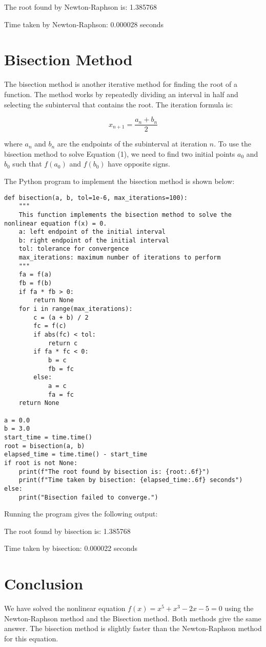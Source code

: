 \documentclass{article}
\begin{document}

The root found by Newton-Raphson is: 1.385768

Time taken by Newton-Raphson: 0.000028 seconds

\section{Bisection Method}

The bisection method is another iterative method for finding the root of a function. The method works by repeatedly dividing an interval in half and selecting the subinterval that contains the root. The iteration formula is:

\begin{equation}
    x_{n+1} = \frac{a_n + b_n}{2}
\end{equation}

where $a_n$ and $b_n$ are the endpoints of the subinterval at iteration $n$. To use the bisection method to solve Equation (1), we need to find two initial points $a_0$ and $b_0$ such that $f(a_0)$ and $f(b_0)$ have opposite signs.


The Python program to implement the bisection method is shown below:

\begin{lstlisting}
def bisection(a, b, tol=1e-6, max_iterations=100):
    """
    This function implements the bisection method to solve the nonlinear equation f(x) = 0.
    a: left endpoint of the initial interval
    b: right endpoint of the initial interval
    tol: tolerance for convergence
    max_iterations: maximum number of iterations to perform
    """
    fa = f(a)
    fb = f(b)
    if fa * fb > 0:
        return None
    for i in range(max_iterations):
        c = (a + b) / 2
        fc = f(c)
        if abs(fc) < tol:
            return c
        if fa * fc < 0:
            b = c
            fb = fc
        else:
            a = c
            fa = fc
    return None

a = 0.0
b = 3.0
start_time = time.time()
root = bisection(a, b)
elapsed_time = time.time() - start_time
if root is not None:
    print(f"The root found by bisection is: {root:.6f}")
    print(f"Time taken by bisection: {elapsed_time:.6f} seconds")
else:
    print("Bisection failed to converge.")

\end{lstlisting}

Running the program gives the following output:


The root found by bisection is: 1.385768

Time taken by bisection: 0.000022 seconds

\section{Conclusion}

We have solved the nonlinear equation $f(x) = x^5 + x^3 - 2x - 5 = 0$ using the Newton-Raphson method and the Bisection method. Both methods give the same answer. The bisection method is slightly faster than the Newton-Raphson method for this equation.
\end{document}
